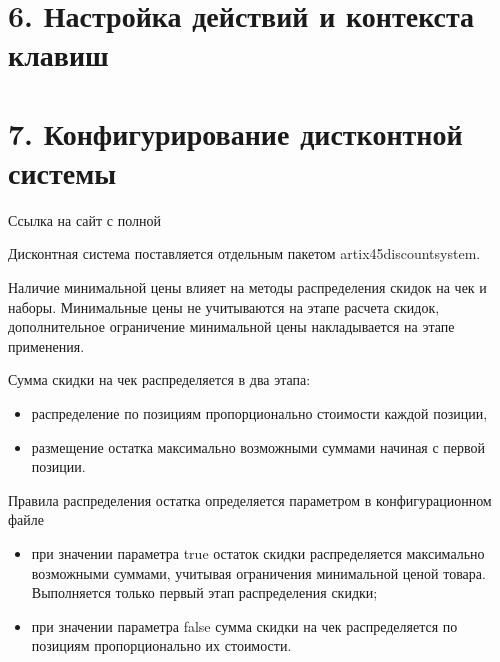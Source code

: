 \documentclass[a4paper,10pt,russian]{report}
\begin{document}
\section{6. Настройка действий и контекста клавиш}
\label{\detokenize{additional:id6}}
\begin{figure}[htbp]
\centering

\noindent{}
\end{figure}


\section{7. Конфигурирование дистконтной системы}
\label{\detokenize{additional:id7}}
\sphinxAtStartPar
Ссылка на сайт с полной 

\sphinxAtStartPar
Дисконтная система поставляется отдельным пакетом artix45\sphinxhyphen{}discountsystem.

\sphinxAtStartPar
Наличие минимальной цены влияет на методы распределения скидок на чек и наборы.
Минимальные цены не учитываются на этапе расчета скидок, дополнительное ограничение минимальной цены накладывается на этапе применения.

\sphinxAtStartPar
Сумма скидки на чек распределяется в два этапа:
\begin{itemize}
\item {} 
\sphinxAtStartPar
распределение по позициям пропорционально стоимости каждой позиции,

\item {} 
\sphinxAtStartPar
размещение остатка максимально возможными суммами начиная с первой позиции.

\end{itemize}

\sphinxAtStartPar
Правила распределения остатка определяется параметром  в конфигурационном файле 
\begin{itemize}
\item {} 
\sphinxAtStartPar
при значении параметра true остаток скидки распределяется максимально возможными суммами, учитывая ограничения минимальной ценой товара. Выполняется только первый этап распределения скидки;

\item {} 
\sphinxAtStartPar
при значении параметра false сумма скидки на чек распределяется по позициям пропорционально их стоимости.

\end{itemize}
\end{document}
